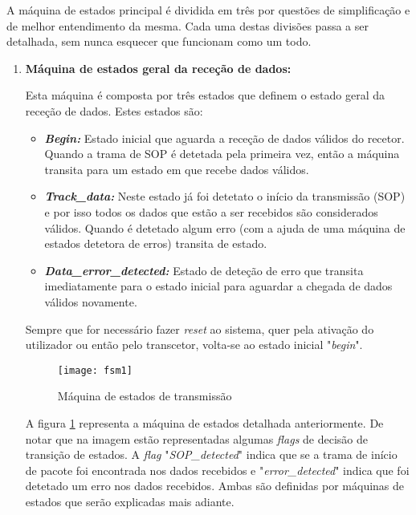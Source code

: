 A máquina de estados principal é dividida em três por questões de simplificação e de melhor entendimento da mesma. Cada uma destas divisões passa a ser detalhada, sem nunca esquecer que funcionam como um todo.

\begin{enumerate}
	\item \textbf{Máquina de estados geral da receção de dados:}
	
	Esta máquina é composta por três estados que definem o estado geral da receção de dados. Estes estados são:
	\begin{itemize}
		\item \textbf{\textit{Begin:}} Estado inicial que aguarda a receção de dados válidos do recetor. Quando a trama de SOP é detetada pela primeira vez, então a máquina transita para um estado em que recebe dados válidos. 
		
		\item \textbf{\textit{Track\_data:}} Neste estado já foi detetato o início da transmissão (SOP) e por isso todos os dados que estão a ser recebidos são considerados válidos. Quando é detetado algum erro (com a ajuda de uma máquina de estados detetora de erros) transita de estado.
		
		\item \textbf{\textit{Data\_error\_detected:} }Estado de deteção de erro que transita imediatamente para o estado inicial para aguardar a chegada de dados válidos novamente.
		
	\end{itemize}

	Sempre que for necessário fazer \textit{reset} ao sistema, quer pela ativação do utilizador ou então pelo transcetor, volta-se ao estado inicial "\textit{begin}".
	
	
	\begin{figure}[h!]
		\begin{center}
			\leavevmode
			\texttt{[image: fsm1]}
			\captionsetup{width=1.0\linewidth}
			\caption[Máquina de estados de transmissão]{Máquina de estados de transmissão}
			\label{fig:FSM1}
	\end{center}
	\end{figure}
	
	A figura \ref{fig:FSM1} representa a máquina de estados detalhada anteriormente. De notar que na imagem estão representadas algumas \textit{flags} de decisão de transição de estados. A \textit{flag} "\textit{SOP\_detected}" indica que se a trama de início de pacote foi encontrada nos dados recebidos e "\textit{error\_detected}" indica que foi detetado um erro nos dados recebidos. Ambas são definidas por máquinas de estados que serão explicadas mais adiante.
	

\end{enumerate}
